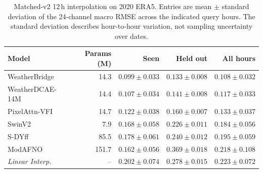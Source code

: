 \begin{table}[!htbp]
\centering
\caption{Matched-v2 12\,h interpolation on 2020 ERA5. Entries are mean $\pm$ standard deviation of the 24-channel macro RMSE across the indicated query hours. The standard deviation describes hour-to-hour variation, not sampling uncertainty over dates.}
\label{tab:main-12h}
\scriptsize
\setlength{\tabcolsep}{3.5pt}
\begin{tabular}{lrrrr}
\toprule
Model & Params (M) & Seen & Held out & All hours \\
\midrule
WeatherBridge & 14.3 & $\mathbf{0.099\pm0.033}$ & $\mathbf{0.133\pm0.008}$ & $\mathbf{0.108\pm0.032}$ \\
WeatherDCAE-14M & 14.4 & \underline{$0.107\pm0.034$} & \underline{$0.141\pm0.008$} & \underline{$0.117\pm0.033$} \\
PixelAttn-VFI & 14.7 & $0.122\pm0.038$ & $0.160\pm0.007$ & $0.133\pm0.037$ \\
SwinV2 & 7.9 & $0.168\pm0.058$ & $0.226\pm0.011$ & $0.184\pm0.056$ \\
S-DYff & 85.5 & $0.178\pm0.061$ & $0.240\pm0.012$ & $0.195\pm0.059$ \\
ModAFNO & 151.7 & $0.162\pm0.056$ & $0.369\pm0.018$ & $0.218\pm0.108$ \\
\midrule
\textit{Linear Interp.} & -- & $0.202\pm0.074$ & $0.278\pm0.015$ & $0.223\pm0.072$ \\
\bottomrule
\end{tabular}
\end{table}
